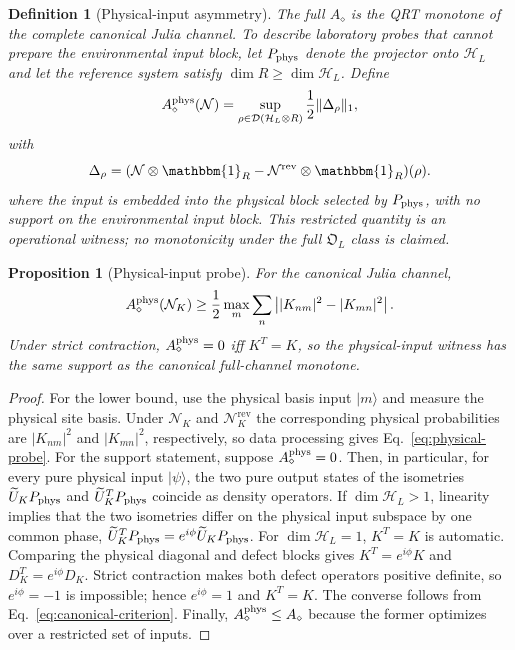 \documentclass[reprint,amsmath,amssymb,aps,nofootinbib]{revtex4-2}
\newtheorem{definition}{Definition}
\newtheorem{proposition}{Proposition}
\newcommand{\id}{\mathbbm{1}}
\newcommand{\FreeOps}{\mathfrak O}
\newcommand{\rev}{\mathrm{rev}}
\begin{document}
\begin{definition}[Physical-input asymmetry]
The full $A_\diamond$ is the QRT monotone of the complete canonical Julia channel. To describe
laboratory probes that cannot prepare the environmental input block, let
$P_{\rm phys}$ denote the projector onto $\mathcal H_L$ and let the reference system satisfy
$\dim R\ge\dim\mathcal H_L$. Define
\begin{equation}
A_\diamond^{\rm phys}(\mathcal N)=
\sup_{\rho\in\mathcal D(\mathcal H_L\otimes R)}
\frac12\lVert\Delta_\rho\rVert_1,
\end{equation}
with
\begin{equation}
\Delta_\rho=(\mathcal N\otimes\id_R-\mathcal N^{\rev}\otimes\id_R)(\rho).
\end{equation}
where the input is embedded into the physical block selected by $P_{\rm phys}$, with no support
on the environmental input block. This restricted quantity is an
operational witness; no monotonicity under the full $\FreeOps_L$ class is claimed.
\end{definition}

\begin{proposition}[Physical-input probe]
For the canonical Julia channel,
\begin{equation}
A_\diamond^{\rm phys}(\mathcal N_K)
\ge
\frac12\max_m\sum_n
\left||K_{nm}|^2-|K_{mn}|^2\right|.
\label{eq:physical-probe}
\end{equation}
Under strict contraction, $A_\diamond^{\rm phys}=0$ iff $K^T=K$, so the physical-input witness
has the same support as the canonical full-channel monotone.
\end{proposition}

\begin{proof}
For the lower bound, use the physical basis input $|m\rangle$ and measure the physical site basis.
Under $\mathcal N_K$ and $\mathcal N_K^{\rev}$ the corresponding physical probabilities are
$|K_{nm}|^2$ and $|K_{mn}|^2$, respectively, so data processing gives Eq.~\eqref{eq:physical-probe}.
For the support statement, suppose $A_\diamond^{\rm phys}=0$. Then, in particular, for every pure
physical input $|\psi\rangle$, the two pure output states of the isometries
$\widetilde U_K P_{\rm phys}$ and $\widetilde U_K^T P_{\rm phys}$ coincide as density operators.
If $\dim\mathcal H_L>1$, linearity implies that the two isometries differ on the physical input
subspace by one common phase,
$\widetilde U_K^T P_{\rm phys}=e^{i\phi}\widetilde U_K P_{\rm phys}$. For
$\dim\mathcal H_L=1$, $K^T=K$ is automatic. Comparing the physical diagonal and defect blocks gives
$K^T=e^{i\phi}K$ and $D_K^T=e^{i\phi}D_K$. Strict contraction makes both defect operators positive
definite, so $e^{i\phi}=-1$ is impossible; hence $e^{i\phi}=1$ and $K^T=K$. The converse follows from
Eq.~\eqref{eq:canonical-criterion}. Finally, $A_\diamond^{\rm phys}\le A_\diamond$ because the former
optimizes over a restricted set of inputs.
\end{proof}
\end{document}
